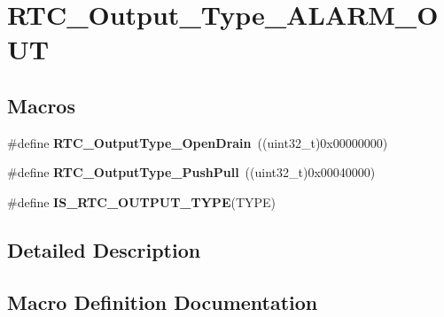 \hypertarget{group___r_t_c___output___type___a_l_a_r_m___o_u_t}{}\section{R\+T\+C\+\_\+\+Output\+\_\+\+Type\+\_\+\+A\+L\+A\+R\+M\+\_\+\+O\+U\+T}
\label{group___r_t_c___output___type___a_l_a_r_m___o_u_t}
\subsection*{Macros}
\begin{DoxyCompactItemize}
\item 
\hypertarget{group___r_t_c___output___type___a_l_a_r_m___o_u_t_gafe3640c3f98b1ad3a609623088335aeb}{}\#define {\bfseries R\+T\+C\+\_\+\+Output\+Type\+\_\+\+Open\+Drain}~((uint32\+\_\+t)0x00000000)\label{group___r_t_c___output___type___a_l_a_r_m___o_u_t_gafe3640c3f98b1ad3a609623088335aeb}

\item 
\hypertarget{group___r_t_c___output___type___a_l_a_r_m___o_u_t_ga16861daafb18357d884baf2133adcc17}{}\#define {\bfseries R\+T\+C\+\_\+\+Output\+Type\+\_\+\+Push\+Pull}~((uint32\+\_\+t)0x00040000)\label{group___r_t_c___output___type___a_l_a_r_m___o_u_t_ga16861daafb18357d884baf2133adcc17}

\item 
\#define {\bfseries I\+S\+\_\+\+R\+T\+C\+\_\+\+O\+U\+T\+P\+U\+T\+\_\+\+T\+Y\+P\+E}(T\+Y\+P\+E)
\end{DoxyCompactItemize}


\subsection{Detailed Description}


\subsection{Macro Definition Documentation}
\hypertarget{group___r_t_c___output___type___a_l_a_r_m___o_u_t_ga69e263212d90ca91ccfc72e930f26cd8}{}
